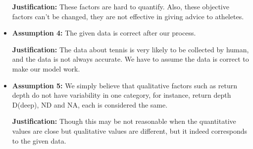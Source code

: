 \begin{itemize}
    \textbf{Justification:} These factors are hard to quantify. Also, these objective factors can't be changed, 
    they are not effective in giving advice to atheletes.

    \item \textbf{Assumption 4:} The given data is correct after our process.
    
    \textbf{Justification:} The data about tennis is very likely to be collected
    by human, and the data is not always accurate. We have to assume the data is correct to make our model work.

    \item \textbf{Assumption 5:} We simply believe that qualitative factors such as return depth do not have variability in one category, for instance, return depth D(deep), ND and NA, each is considered the same.
    
    \textbf{Justification:} Though this may be not reasonable when the quantitative values are close but qualitative values are different, but it indeed corresponds to the given data.
\end{itemize}
